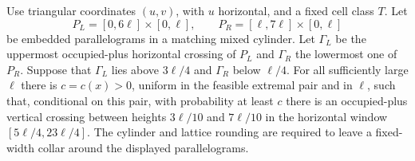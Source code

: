 \begin{lemma}
\label{annulus:gluing}
Use triangular coordinates $(u,v)$, with $u$ horizontal, and a fixed
cell class $T$.  Let
\[
 P_L=[0,6\ell]\times[0,\ell],\qquad
 P_R=[\ell,7\ell]\times[0,\ell]
\]
be embedded parallelograms in a matching mixed cylinder.  Let $\Gamma_L$
be the uppermost occupied-plus horizontal crossing of $P_L$ and
$\Gamma_R$ the lowermost one of $P_R$.  Suppose that $\Gamma_L$ lies
above $3\ell/4$ and $\Gamma_R$ below $\ell/4$.
For all sufficiently large $\ell$ there is $c=c(x)>0$, uniform in
the feasible extremal pair and in $\ell$, such that, conditional on
this pair, with probability at least
$c$ there is an occupied-plus vertical crossing between heights
$3\ell/10$ and $7\ell/10$ in the horizontal window
$[5\ell/4,23\ell/4]$.
The cylinder and lattice rounding are required to leave a fixed-width
collar around the displayed parallelograms.
\end{lemma}
